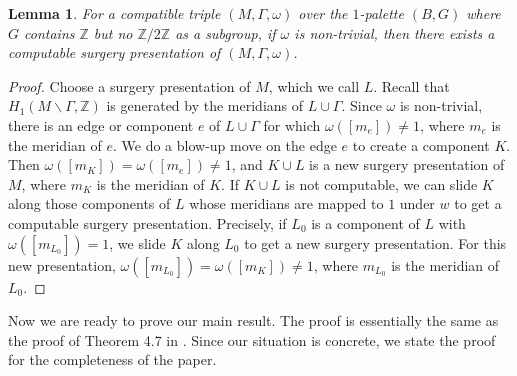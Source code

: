 \documentclass[12pt]{amsart}
\newtheorem{lemma}[theo]{Lemma}
\begin{document}
\begin{lemma}
For a compatible triple $(M, \Gamma, \omega)$ over the $1$-palette $(B, G)$ where $G$ contains $\mathbb{Z}$ but no $\mathbb{Z}/2\mathbb{Z}$ as a subgroup, if $\omega$ is non-trivial, then there exists a computable surgery presentation of $(M, \Gamma, \omega)$.
\end{lemma}
\begin{proof}
Choose a surgery presentation of $M$, which we call $L$. Recall that $H_{1}(M\backslash \Gamma, \mathbb{Z})$ is generated by the meridians of $L\cup \Gamma$. Since $\omega$ is non-trivial, there is an edge or component $e$ of $L\cup \Gamma$ for which $\omega ([m_e])\neq 1$, where $m_e$ is the meridian of $e$. We do a blow-up move on the edge $e$ to create a component $K$. Then $\omega([m_K])=\omega ([m_e])\neq 1$, and $K\cup L$ is a new surgery presentation of $M$, where $m_K$ is the meridian of $K$.
If $K\cup L$ is not computable, we can slide $K$ along those components of $L$ whose meridians are mapped to $1$ under $w$ to get a computable surgery presentation. Precisely, if $L_0$ is a component of $L$ with $\omega ([m_{L_0}])=1$, we slide $K$ along $L_0$ to get a new surgery presentation. For this new presentation, $\omega ([m_{L_0}])=\omega([m_K])\neq 1$, where $m_{L_0}$ is the meridian of $L_0$. 
\end{proof}

Now we are ready to prove our main result. The proof is essentially the same as the proof of Theorem 4.7 in \cite{MR3286896}. Since our situation is concrete, we state the proof for the completeness of the paper.
\end{document}
